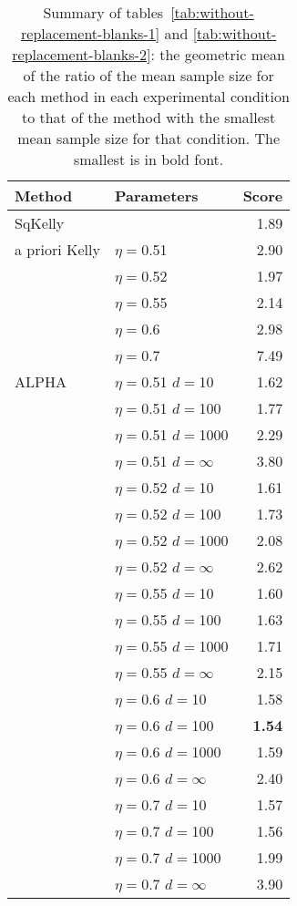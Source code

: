 \documentclass[aoas]{imsart}
\begin{document}
\begin{table}
\centering
\tiny
\begin{tabular}{llr}\\ 
Method & Parameters & Score \\
\hline SqKelly & & 1.89 \\ 
 \hline a priori Kelly 
 & $\eta=$0.51 & 2.90 \\
 & $\eta=$0.52 & 1.97 \\
 & $\eta=$0.55 & 2.14 \\
 & $\eta=$0.6 & 2.98 \\
 & $\eta=$0.7 & 7.49 \\
\hline ALPHA 
 & $\eta=$0.51 $d=$10 & 1.62 \\ 
 & $\eta=$0.51 $d=$100 & 1.77 \\ 
 & $\eta=$0.51 $d=$1000 & 2.29 \\ 
 & $\eta=$0.51 $d=\infty$ & 3.80 \\
\cline{2-3}
 & $\eta=$0.52 $d=$10 & 1.61 \\ 
 & $\eta=$0.52 $d=$100 & 1.73 \\ 
 & $\eta=$0.52 $d=$1000 & 2.08 \\ 
 & $\eta=$0.52 $d=\infty$ & 2.62 \\
\cline{2-3}
 & $\eta=$0.55 $d=$10 & 1.60 \\ 
 & $\eta=$0.55 $d=$100 & 1.63 \\ 
 & $\eta=$0.55 $d=$1000 & 1.71 \\ 
 & $\eta=$0.55 $d=\infty$ & 2.15 \\
\cline{2-3}
 & $\eta=$0.6 $d=$10 & 1.58 \\ 
 & $\eta=$0.6 $d=$100 & \bf{1.54} \\ 
 & $\eta=$0.6 $d=$1000 & 1.59 \\ 
 & $\eta=$0.6 $d=\infty$ & 2.40 \\
\cline{2-3}
 & $\eta=$0.7 $d=$10 & 1.57 \\ 
 & $\eta=$0.7 $d=$100 & 1.56 \\ 
 & $\eta=$0.7 $d=$1000 & 1.99 \\ 
 & $\eta=$0.7 $d=\infty$ & 3.90 \\
\end{tabular}
\caption{\protect \label{tab:summary}
Summary of tables~\ref{tab:without-replacement-blanks-1} and \ref{tab:without-replacement-blanks-2}:
the geometric mean of the ratio of the mean sample size for each method in each experimental condition to
that of the method with the smallest mean sample size for that condition.
The smallest is in bold font.
}
\end{table}
\end{document}
